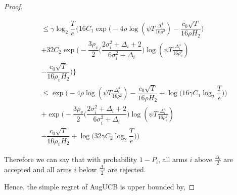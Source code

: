 \begin{proof}
\begin{small}
\begin{align*}
& \leq \gamma\log_{2}\dfrac{T}{e}\bigg\lbrace 16C_1\exp\bigg(-4\rho\log (\psi T\frac{\Delta_{i}^{4}}{16\rho^{2}})-\dfrac{c_{0}\sqrt{T}}{16\rho H_{2}}\bigg) \\
& + 32C_2\exp\bigg(- \dfrac{3\rho_v}{2} \bigg(\dfrac{2\sigma_{i}^{2}+\Delta_{i}+2}{6\sigma_{i}^{2}+\Delta_{i}}\bigg)\log(\psi T\frac{\Delta_{i}^{4}}{16\rho_{v}^{2}})\\
& -\dfrac{c_{0}\sqrt{T}}{16\rho_v H_{2}}  \bigg)\bigg\rbrace\\
& \leq \exp\bigg(-4\rho\log (\psi T\frac{\Delta_{i}^{4}}{16\rho^{2}})-\dfrac{c_{0}\sqrt{T}}{16\rho H_{2}} + \log \big( 16\gamma C_1\log_{2}\dfrac{T}{e}\big) \bigg)\\
& + \exp\bigg(- \dfrac{3\rho_v}{2} \bigg(\dfrac{2\sigma_{i}^{2}+\Delta_{i}+2}{6\sigma_{i}^{2}+\Delta_{i}}\bigg)\log(\psi T\frac{\Delta_{i}^{4}}{16\rho_{v}^{2}})\\
& -\dfrac{c_{0}\sqrt{T}}{16\rho_v H_{2}} + \log\big( 32\gamma C_2\log_{2}\dfrac{T}{e} \big)  \bigg)
\end{align*}
\end{small}


Therefore we can say that with probability $1-P_{i}$, all arms $i$ above $\frac{\Delta_{i}}{2}$ are accepted and all arms $i$ below $\frac{\Delta_{i}}{2}$ are rejected. 

Hence, the simple regret of AugUCB is upper bounded by,


\end{proof}
